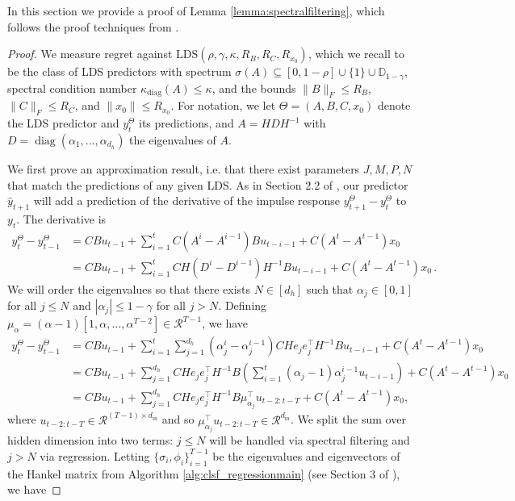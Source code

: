 \documentclass[11pt]{article}
\renewcommand{\subset}{\subseteq}
\def\R{{\mathcal R}}
\def\R{\ensuremath{\mathcal R}}
\numberwithin{equation}{section}
\begin{document}
In this section we provide a proof of Lemma \ref{lemma:spectralfiltering}, which follows the proof techniques from \cite{hazan2017learning}.
\begin{proof}
We measure regret against $\mathrm{LDS}(\rho, \gamma, \kappa, R_{B}, R_C, R_{x_0})$, which we recall to be the class of LDS predictors with spectrum $\sigma(A) \subset [0, 1-\rho] \cup \{1\} \cup \mathbb{D}_{1-\gamma}$, spectral condition number $\kappa_{\mathrm{diag}}(A) \leq \kappa$, and the bounds $\|B\|_F \leq R_{B}$, $\|C\|_F \leq R_C$, and $\|x_0\| \leq R_{x_0}$. For notation, we let $\Theta = (A, B, C, x_0)$ denote the LDS predictor and $y_t^\Theta$ its predictions, and $A = HDH^{-1}$ with $D = \operatorname{diag}(\alpha_1, \ldots, \alpha_{d_h})$ the eigenvalues of $A$.

We first prove an approximation result, i.e. that there exist parameters $J, M, P, N$ that match the predictions of any given LDS.
As in Section 2.2 of \cite{hazan2017learning}, our predictor $\hat{y}_{t+1}$ will add a prediction of the derivative of the impulse response $y_{t+1}^\Theta - y_{t}^\Theta$ to $y_{t}$. The derivative is
\begin{align*}
    y_t^\Theta - y_{t-1}^{\Theta}  & = CBu_{t-1} + \sum_{i=1}^{t} C(A^{i} - A^{i-1})Bu_{t-i-1} + C(A^t - A^{t-1})x_0 \\
    & = CBu_{t-1} + \sum_{i=1}^{t} CH(D^{i} - D^{i-1})H^{-1}Bu_{t-i-1} + C(A^t - A^{t-1})x_0\,.
\end{align*}
We will order the eigenvalues so that there exists $N \in [d_h]$ such that $\alpha_j \in [0, 1]$ for all $j \leq N$ and $|\alpha_j| \leq 1 - \gamma$ for all $j > N$. Defining $\mu_\alpha = (\alpha - 1) [1, \alpha, \ldots, \alpha^{T-2}] \in \R^{T-1}$, we have
\begin{align*}
    y_t^\Theta - y_{t-1}^{\Theta} 
    & = CBu_{t-1} + \sum_{i=1}^{t} \sum_{j=1}^{d_h} (\alpha_j^i - \alpha_j^{i-1}) CHe_je_j^\top H^{-1}Bu_{t-i-1} + C(A^t - A^{t-1})x_0 \\
    &= CBu_{t-1} + \sum_{j=1}^{d_h} CHe_je_j^\top H^{-1}B \left(\sum_{i=1}^t (\alpha_j - 1) \alpha_j^{i-1} u_{t-i-1}\right) + C(A^t - A^{t-1}) x_0 \\ &= CBu_{t-1} + \sum_{j=1}^{d_h} CHe_je_j^\top H^{-1} B\mu_{\alpha_j}^\top u_{t-2:t-T} + C(A^t - A^{t-1}) x_0,
\end{align*}
where $u_{t-2:t-T} \in \R^{(T-1) \times d_{\textrm{in}}}$ and so $\mu_{\alpha_j}^\top u_{t-2:t-T} \in \R^{d_{\textrm{in}}}$.
We split the sum over hidden dimension into two terms: $j \leq N$ will be handled via spectral filtering and $j > N$ via regression. Letting $\{\sigma_i, \phi_i\}_{i=1}^{T-1}$ be the eigenvalues and eigenvectors of the Hankel matrix from Algorithm \ref{alg:clsf_regressionmain} (see Section 3 of \cite{hazan2017learning}), we have

\end{proof}
\end{document}
